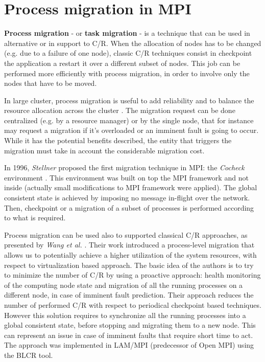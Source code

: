 \section{Process migration in MPI}
\textbf{Process migration} - or \textbf{task migration} - is a technique that
can be used in alternative or in support to C/R. When the allocation of
nodes has to be changed (e.g. due to a failure of one node), classic C/R 
techniques consist in checkpoint the application a restart it over a different
subset of nodes. This job can be performed more efficiently with process
migration, in order to involve only the nodes that have to be moved.

In large cluster, process migration is useful to add reliability and
to balance the resource allocation across the cluster \cite{hussain2013survey}.
The migration request can be done centralized (e.g. by a resource manager) or
by the single node, that for instance may request a migration if it's overloaded
or an imminent fault is going to occur.
While it has the potential benefits described, the entity that triggers the
migration must take in account the considerable migration cost. 

In 1996, \emph{Stellner} proposed the first migration technique in MPI:
the \emph{Cocheck} environment \cite{stellner1996cocheck}. This environment
was built on top the MPI framework and not inside (actually small modifications
to MPI framework were applied). The global
consistent state is achieved by imposing no message in-flight over the
network. Then, checkpoint or a migration of a subset of processes is performed
according to what is required.

Process migration can be used also to supported classical C/R approaches, as
presented by \emph{Wang et al.} \cite{wang2008proactive}. Their work introduced
a process-level migration that allows us to potentially achieve a higher
utilization of the system resources, with respect to virtualization based
approach. The basic idea of the authors is to try to minimize the number of
C/R by using
a proactive approach: health monitoring of the computing node state and
migration of all the running processes on a different node, in case of
imminent fault prediction. Their approach reduces the number of performed C/R
with respect to periodical checkpoint based techniques. However this solution
requires to synchronize all the running processes into a global consistent
state, before stopping and migrating them to a new node. This can represent
an issue in case of imminent faults that require short time to act. The
approach was implemented in LAM/MPI (predecessor of Open MPI) using the BLCR
tool.

